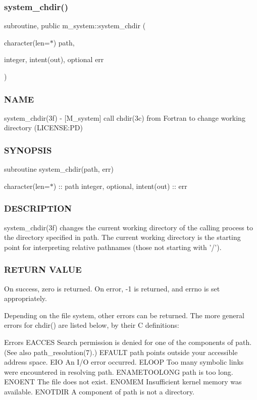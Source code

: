 \subsubsection{\texorpdfstring{system\+\_\+chdir()}{system\_chdir()}}
{\footnotesize\ttfamily subroutine, public m\+\_\+system\+::system\+\_\+chdir (\begin{DoxyParamCaption}\item[{character(len=$\ast$)}]{path,  }\item[{integer, intent(out), optional}]{err }\end{DoxyParamCaption})}



\subsubsection*{N\+A\+ME}

system\+\_\+chdir(3f) -\/ \mbox{[}M\+\_\+system\mbox{]} call chdir(3c) from Fortran to change working directory (L\+I\+C\+E\+N\+SE\+:PD) \subsubsection*{S\+Y\+N\+O\+P\+S\+IS}

subroutine system\+\_\+chdir(path, err)

character(len=$\ast$) \+:\+: path integer, optional, intent(out) \+:\+: err

\subsubsection*{D\+E\+S\+C\+R\+I\+P\+T\+I\+ON}

\begin{DoxyVerb}system_chdir(3f) changes the current working directory of the calling
process to the directory specified in path. The current working
directory is the starting point for interpreting relative pathnames
(those not starting with '/').
\end{DoxyVerb}


\subsubsection*{R\+E\+T\+U\+RN V\+A\+L\+UE}

\begin{DoxyVerb}On success, zero is returned. On error, -1 is returned, and errno is
set appropriately.


Depending on the file system, other errors can be returned. The more
general errors for chdir() are listed below, by their C definitions:

Errors
EACCES        Search permission is denied for one of the components of path.
              (See also path_resolution(7).)
EFAULT        path points outside your accessible address space.
EIO           An I/O error occurred.
ELOOP         Too many symbolic links were encountered in resolving path.
ENAMETOOLONG  path is too long.
ENOENT        The file does not exist.
ENOMEM        Insufficient kernel memory was available.
ENOTDIR       A component of path is not a directory.
\end{DoxyVerb}


